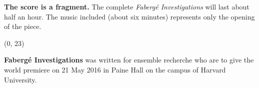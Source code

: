 \documentclass[10pt]{article}
\begin{document}
\begin{textblock}{23}
\textbf{The score is a fragment.} The complete \textit{Faberg\'{e}
Investigations} will last about half an hour. The music included (about six
minutes) represents only the opening of the piece.

\end{textblock}

\begin{textblock}{23}(0, 23)

\textbf{Faberg\'{e} Investigations} was written for ensemble recherche who are
to give the world premiere on 21 May 2016 in Paine Hall on the campus of
Harvard University.

\end{textblock}
\end{document}
